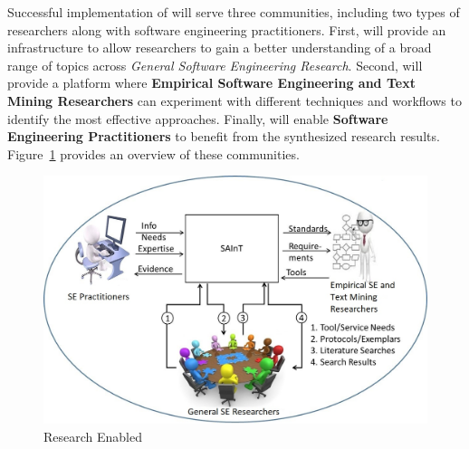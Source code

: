 Successful implementation of {\IT} will serve three communities, including two types of researchers along with software engineering practitioners. 
First, {\IT} will provide an infrastructure to allow researchers to gain a better understanding of a broad range of topics across \textit{General Software Engineering Research}.
Second, {\IT} will provide a platform where \textbf{Empirical Software Engineering and Text Mining Researchers} can experiment with different techniques and workflows to identify the most effective approaches.
Finally, {\IT} will enable \textbf{Software Engineering Practitioners} to benefit from the synthesized research results.
Figure~\ref{figure-ResearchEnabled} provides an overview of these communities.

\begin{figure}
	\centering
	\includegraphics[width=4.5in]{ResearchEnabled}
	\caption{Research Enabled}
	\label{figure-ResearchEnabled}
\end{figure}

\vspace{8pt}
 
